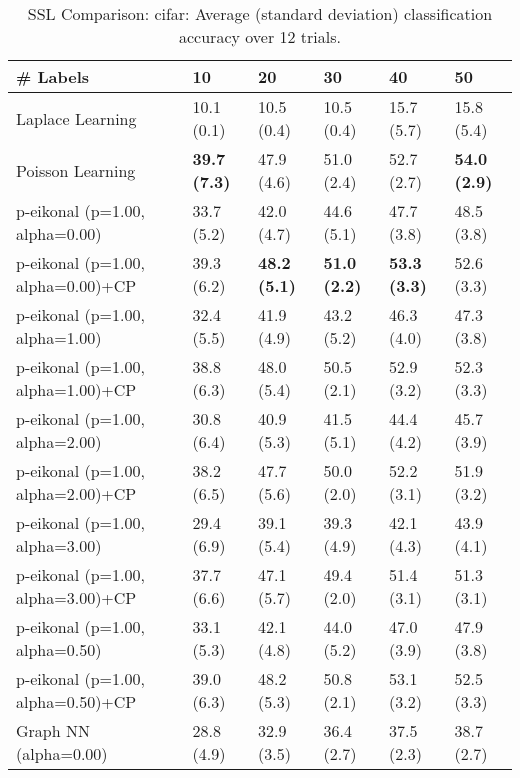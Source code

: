 \documentclass{article}
\begin{document}
\begin{table*}[t!]
\vspace{-3mm}
\caption{SSL Comparison: cifar: Average (standard deviation) classification accuracy over 12 trials.}
\vspace{-3mm}
\label{tab:SSL Comparison: cifar}
\vskip 0.15in
\begin{center}
\begin{small}
\begin{sc}
\begin{tabular}{llllll}
\toprule
\# Labels&\textbf{10}&\textbf{20}&\textbf{30}&\textbf{40}&\textbf{50}\\
\midrule
Laplace Learning&10.1 (0.1)      &10.5 (0.4)      &10.5 (0.4)      &15.7 (5.7)      &15.8 (5.4)      \\
Poisson Learning&{\bf 39.7 (7.3)}&47.9 (4.6)      &51.0 (2.4)      &52.7 (2.7)      &{\bf 54.0 (2.9)}\\
p-eikonal (p=1.00, alpha=0.00)&33.7 (5.2)      &42.0 (4.7)      &44.6 (5.1)      &47.7 (3.8)      &48.5 (3.8)      \\
p-eikonal (p=1.00, alpha=0.00)+CP&39.3 (6.2)      &{\bf 48.2 (5.1)}&{\bf 51.0 (2.2)}&{\bf 53.3 (3.3)}&52.6 (3.3)      \\
p-eikonal (p=1.00, alpha=1.00)&32.4 (5.5)      &41.9 (4.9)      &43.2 (5.2)      &46.3 (4.0)      &47.3 (3.8)      \\
p-eikonal (p=1.00, alpha=1.00)+CP&38.8 (6.3)      &48.0 (5.4)      &50.5 (2.1)      &52.9 (3.2)      &52.3 (3.3)      \\
p-eikonal (p=1.00, alpha=2.00)&30.8 (6.4)      &40.9 (5.3)      &41.5 (5.1)      &44.4 (4.2)      &45.7 (3.9)      \\
p-eikonal (p=1.00, alpha=2.00)+CP&38.2 (6.5)      &47.7 (5.6)      &50.0 (2.0)      &52.2 (3.1)      &51.9 (3.2)      \\
p-eikonal (p=1.00, alpha=3.00)&29.4 (6.9)      &39.1 (5.4)      &39.3 (4.9)      &42.1 (4.3)      &43.9 (4.1)      \\
p-eikonal (p=1.00, alpha=3.00)+CP&37.7 (6.6)      &47.1 (5.7)      &49.4 (2.0)      &51.4 (3.1)      &51.3 (3.1)      \\
p-eikonal (p=1.00, alpha=0.50)&33.1 (5.3)      &42.1 (4.8)      &44.0 (5.2)      &47.0 (3.9)      &47.9 (3.8)      \\
p-eikonal (p=1.00, alpha=0.50)+CP&39.0 (6.3)      &48.2 (5.3)      &50.8 (2.1)      &53.1 (3.2)      &52.5 (3.3)      \\
Graph NN (alpha=0.00)&28.8 (4.9)      &32.9 (3.5)      &36.4 (2.7)      &37.5 (2.3)      &38.7 (2.7)      \\

\end{tabular}
\end{sc}
\end{small}
\end{center}
\end{table*}
\end{document}
